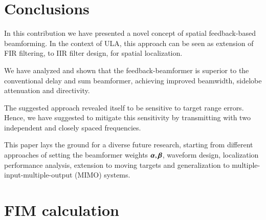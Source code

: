 \documentclass[journal]{IEEEtran}
\begin{document}
\section{Conclusions}
\label{sec_conclusions}
In this contribution we have presented a novel concept of spatial feedback-based beamforming. In the context of ULA, this approach can be seen as extension of FIR filtering, to IIR filter design, for spatial localization.
\par We have analyzed and shown that the feedback-beamformer is superior to the conventional delay and sum beamformer, achieving improved beamwidth, sidelobe attenuation and directivity.
\par The suggested approach revealed itself to be sensitive to target range errors. Hence, we have suggested to mitigate this sensitivity by transmitting with two  independent and closely spaced frequencies.
\par This paper lays the ground for a diverse future research, starting from different approaches of setting the beamformer weights $\boldsymbol{\alpha},\boldsymbol{\beta}$, waveform design, localization performance analysis, extension to moving targets and generalization to multiple-input-multiple-output (MIMO) systems.

%
\appendices
\section{FIM calculation}
\label{apdx_clacFim}

\end{document}
